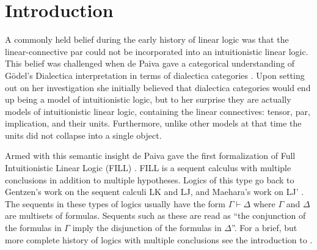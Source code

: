 \section{Introduction}
\label{sec:introduction}

A commonly held belief during the early history of linear logic was
that the linear-connective par could not be incorporated into an
intuitionistic linear logic.  This belief was challenged when de Paiva
gave a categorical understanding of G\"odel's Dialectica
interpretation in terms of dialectica categories
\cite{dePaiva:1987,dePaiva:1988}.  Upon setting out on her
investigation she initially believed that dialectica categories would
end up being a model of intuitionistic logic, but to her surprise they
are actually models of intuitionistic linear logic, containing the
linear connectives: tensor, par, implication, and their units.
Furthermore, unlike other models at that time the units did not
collapse into a single object.

Armed with this semantic insight de Paiva gave the first formalization
of Full Intuitionistic Linear Logic (FILL) \cite{dePaiva:1988}.  FILL
is a sequent calculus with multiple conclusions in addition to
multiple hypotheses.  Logics of this type go back to Gentzen's work on
the sequent calculi LK and LJ, and Maehara's work on LJ'
\cite{Maehara:1954,Takeuti:1975}.  The sequents in these types of
logics usually have the form $\Gamma \vdash \Delta$ where $\Gamma$ and
$\Delta$ are multisets of formulas.  Sequents such as these are read
as ``the conjunction of the formulas in $\Gamma$ imply the disjunction
of the formulas in $\Delta$''.  For a brief, but more complete history
of logics with multiple conclusions see the introduction to
\cite{dePaiva:2005}.

